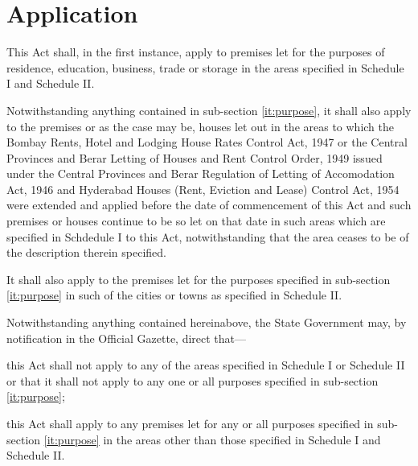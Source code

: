 \documentclass{mhact}
\begin{document}
\section{Application}
\begin{subsectionlist}
\item This Act shall, in the first instance, apply to premises let for
  the purposes of residence, education, business, trade or storage in
  the areas specified in Schedule I and Schedule II.
  \label{it:purpose}
\item Notwithstanding anything contained in sub-section
  \ref{it:purpose}, it shall
  also apply to the premises or as the case may be, houses let out in
  the areas to which the Bombay Rents, Hotel and Lodging House Rates
  Control Act, 1947 or the Central
  Provinces and Berar Letting of Houses and Rent Control Order, 1949
  issued under the Central Provinces and Berar Regulation of Letting
  of Accomodation Act, 1946
  and Hyderabad Houses (Rent, Eviction and Lease) Control Act, 1954
   were extended and applied before
  the date of commencement of this Act and such premises or houses
  continue to be so let on that date in such areas which are specified
  in Schdedule I to this Act, notwithstanding that the area ceases to
  be of the description therein specified.

\item It shall also apply to the premises let for the purposes
  specified in sub-section \ref{it:purpose} in such of the cities or
  towns as specified in Schedule II.
\item Notwithstanding anything
  contained hereinabove, the State Government may, by notification in
  the Official Gazette, direct that---
  \begin{clause}
  \item this Act shall not apply to any of the areas specified in Schedule I or
    Schedule II or that it shall not apply to any one or all purposes specified in
    sub-section \ref{it:purpose};
  \item this Act shall apply to any premises let for any or all
    purposes specified in sub-section \ref{it:purpose} in the areas
    other than those specified in Schedule I and Schedule II.
  \end{clause} 

\end{subsectionlist}
\end{document}
